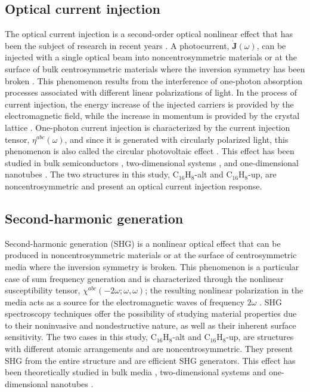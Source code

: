 \documentclass[pss]{wiley2sp} %
\begin{document}
\subsection{Optical current injection}

The optical current injection is a second-order optical nonlinear effect that
has been the subject of research in recent years
\cite{arzatePRB14,bhatPRB05,fraserPRL99,hachePRL97,lamanAPL99}. A
photocurrent, $\mathbf{\dot{J}}(\omega)$, can be injected with a single
optical beam into noncentrosymmetric materials or at the surface of bulk
centrosymmetric materials where the inversion symmetry has been broken
\cite{arzatePRB14}. This phenomenon results from the interference of one-photon 
absorption processes associated with different linear polarizations of
light. In the process of current injection, the energy increase of the
injected carriers is provided by the electromagnetic field, while the
increase in momentum is provided by the crystal lattice \cite{arzatePRB14}.
One-photon current injection is characterized by the current injection
tensor, $\eta^{abc}(\omega)$, and since it is generated with circularly
polarized light, this phenomenon is also called the circular photovoltaic
effect \cite{sturmanCRCP92}. This effect has been studied in bulk
semiconductors \cite{hachePRL97,sipePRB00}, two-dimensional systems
\cite{melePRB00,cabellosPRB11}, and one-dimensional nanotubes
\cite{melePRB00}. The two structures in this study, C$_{16}$H$_{8}$-alt and
C$_{16}$H$_{8}$-up, are noncentrosymmetric and present an optical current
injection response.


\subsection{Second-harmonic generation}

Second-harmonic generation (SHG) is a nonlinear optical effect that can be
produced in noncentrosymmetric materials or at the surface of centrosymmetric
media where the inversion symmetry is broken. This phenomenon is a particular
case of sum frequency generation and is characterized through the nonlinear
susceptibility tensor, $\chi^{abc}(-2\omega;\omega,\omega)$; the resulting
nonlinear polarization in the media acts as a source for the electromagnetic
waves of frequency $2\omega$ \cite{loudonOUP00}. SHG spectroscopy techniques
offer the possibility of studying material properties due to their noninvasive
and nondestructive nature, as well as their inherent surface sensitivity. The two cases in
this study, C$_{16}$H$_{8}$-alt and C$_{16}$H$_{8}$-up, are structures with
different atomic arrangements and are noncentrosymmetric. They present SHG
from the entire structure and are efficient SHG generators. This effect has
been theoretically studied in bulk media \cite{andersonPRB15,figliozziPRL05},
two-dimensional systems \cite{mendozaPRB97,niAPL03} and one-dimensional
nanotubes \cite{salazarPRB14,guoPRB05}.
\end{document}
